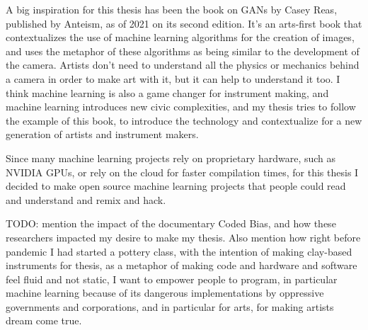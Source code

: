 A big inspiration for this thesis has been the book on GANs by Casey Reas, published by Anteism, as of 2021 on its second edition. It’s an arts-first book that contextualizes the use of machine learning algorithms for the creation of images, and uses the metaphor of these algorithms as being similar to the development of the camera. Artists don’t need to understand all the physics or mechanics behind a camera in order to make art with it, but it can help to understand it too. I think machine learning is also a game changer for instrument making, and machine learning introduces new civic complexities, and my thesis tries to follow the example of this book, to introduce the technology and contextualize for a new generation of artists and instrument makers.

Since many machine learning projects rely on proprietary hardware, such as NVIDIA GPUs, or rely on the cloud for faster compilation times, for this thesis I decided to make open source machine learning projects that people could read and understand and remix and hack.

TODO: mention the impact of the documentary Coded Bias, and how these researchers impacted my desire to make my thesis. Also mention how right before pandemic I had started a pottery class, with the intention of making clay-based instruments for thesis, as a metaphor of making code and hardware and software feel fluid and not static, I want to empower people to program, in particular machine learning because of its dangerous implementations by oppressive governments and corporations, and in particular for arts, for making artists dream come true.
